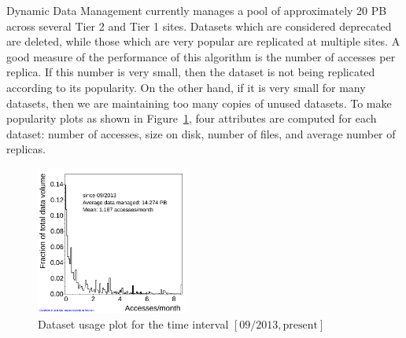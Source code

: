 Dynamic Data Management currently manages a pool of approximately 20 PB across several Tier 2 and Tier 1 sites. Datasets which are considered deprecated are deleted, while those which are very popular are replicated at multiple sites. A good measure of the performance of this algorithm is the number of accesses per replica. If this number is very small, then the dataset is not being replicated according to its popularity. On the other hand, if it is very small for many datasets, then we are maintaining too many copies of unused datasets. To make popularity plots as shown in Figure~\ref{fig:usage}, four attributes are computed for each dataset: number of accesses, size on disk, number of files, and average number of replicas.

\begin{figure}[htbp]
    \centering
    \includegraphics[width=0.45\textwidth]{plots/DatasetSummaryAll_nSitesAverage.png}
    \caption{Dataset usage plot for the time interval $[09/2013,\text{present}]$}
    \label{fig:usage}
\end{figure}



